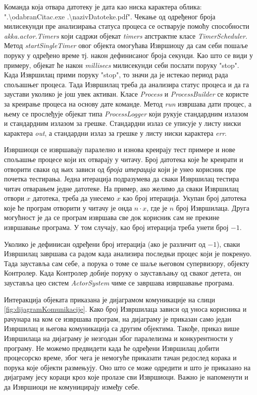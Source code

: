 \documentclass[12pt,oneside]{memoir}
\begin{document}
Команда која отвара датотеку је дата као ниска карактера облика: ".\textbackslash odabranCitac.exe .\textbackslash nazivDatoteke.pdf". Чекање од одређеног броја милисекунди пре анализирања статуса процеса се остварује помоћу способности \textit{akka.actor.Timers} који садржи објекат \textit{timers} апстрактне класе \textit{TimerScheduler}. Метод \textit{startSingleTimer} овог објекта омогућава Извршиоцу да сам себи пошаље поруку у одређено време тј. након дефинисаног броја секунди. Као што се види у примеру, објекат ће након \textit{millisecs} милисекунди себи послати поруку "stop". Када Извршилац прими поруку "stop", то значи да је истекао период рада спољашњег процеса. Тада Извршилац треба да анализира  статус процеса и да га заустави уколико је још увек активан. Класе \textit{Process} и \textit{ProcessBuilder} се користе за креирање процеса на основу дате команде. Метод \textit{run} извршава дати процес, а њему се прослеђује објекат типа \textit{ProcessLogger} који рукује стандардним излазом и стандардним излазом за грешке. Стандардни излаз се уписује у листу ниски карактера \textit{out}, а стандардни излаз за грешке у листу ниски карактера \textit{err}.

Извршиоци се извршавају паралелно и изнова креирају тест примере и нове спољашње процесе који их отварају у читачу. Број датотека које ће креирати и отворити сваки од њих зависи од \textit{броја итерација} који је унео корисник пре почетка тестирања. Једна итерација подразумева да сваки Извршилац тестира читач отварањем једне датотеке. На пример, ако желимо да сваки Извршилац отвори $x$ датотека, треба да унесемо $x$ као број итерација. Укупан број датотека које ће програм отворити у читачу је онда $n \cdot x$, где је $n$ број Извршилаца. Друга могућност је да се програм извршава све док корисник сам не прекине извршавање програма. У том случају, као број итерација треба унети број $-1$.

Уколико је дефинисан одређени број итерација (ако је различит од $-1$), сваки Извршилац завршава са радом када анализира последњи процес који је покренуо. Тада зауставља сам себе, а порука о томе се шаље његовом супервизору, објекту Контролер. Када Контролер добије поруку о заустављању од сваког детета, он зауставља цео систем \textit{ActorSystem} чиме се завршава извршавање програма.

Интеракција објеката приказана је дијаграмом комуникације на слици \ref{fig:dijagramKomunikacije}. Како број Извршилаца зависи од уноса корисника и рачунара на ком се извршава програм, на дијаграму је приказан само један Извршилац и његова комуникација са другим објектима. Такође, приказ више Извршилаца на дијаграму је незгодан због паралелизма и конкурентности у програму. Не можемо предвидети када ће одређени Извршилац добити процесорско време, због чега је немогуће приказати тачан редослед корака и порука које објекти размењују. Оно што се може одредити и што је приказано на дијаграму јесу кораци кроз које пролазе сви Извршиоци. Важно је напоменути и да Извршиоци не комуницирају између себе.  
\end{document}
